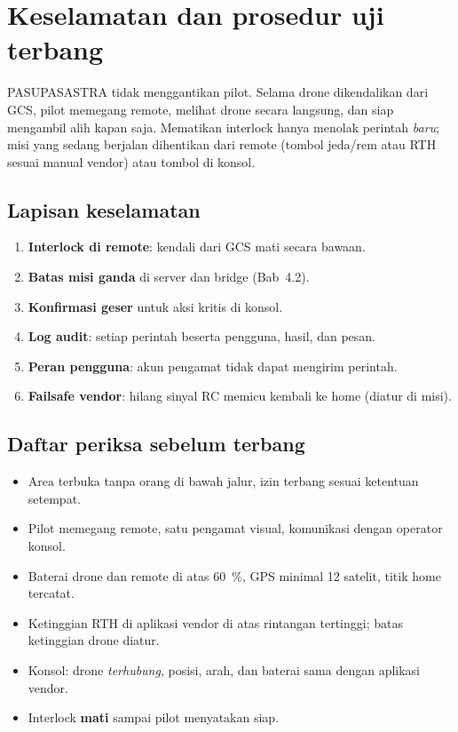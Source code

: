 \chapter{Keselamatan dan prosedur uji terbang}
\begin{bahaya}
PASUPASASTRA tidak menggantikan pilot. Selama drone dikendalikan dari GCS, pilot memegang remote, melihat drone secara langsung, dan siap mengambil alih kapan saja. Mematikan interlock hanya menolak perintah \emph{baru}; misi yang sedang berjalan dihentikan dari remote (tombol jeda/rem atau RTH sesuai manual vendor) atau tombol  di konsol.
\end{bahaya}

\section{Lapisan keselamatan}
\begin{enumerate}
\item \textbf{Interlock di remote}: kendali dari GCS mati secara bawaan.
\item \textbf{Batas misi ganda} di server dan bridge (Bab~4.2).
\item \textbf{Konfirmasi geser} untuk aksi kritis di konsol.
\item \textbf{Log audit}: setiap perintah beserta pengguna, hasil, dan pesan.
\item \textbf{Peran pengguna}: akun pengamat tidak dapat mengirim perintah.
\item \textbf{Failsafe vendor}: hilang sinyal RC memicu kembali ke home (diatur di misi).
\end{enumerate}

\section{Daftar periksa sebelum terbang}
\begin{itemize}
\item Area terbuka tanpa orang di bawah jalur, izin terbang sesuai ketentuan setempat.
\item Pilot memegang remote, satu pengamat visual, komunikasi dengan operator konsol.
\item Baterai drone dan remote di atas 60~\%, GPS minimal 12 satelit, titik home tercatat.
\item Ketinggian RTH di aplikasi vendor di atas rintangan tertinggi; batas ketinggian drone diatur.
\item Konsol: drone \emph{terhubung}, posisi, arah, dan baterai sama dengan aplikasi vendor.
\item Interlock \textbf{mati} sampai pilot menyatakan siap.
\end{itemize}

